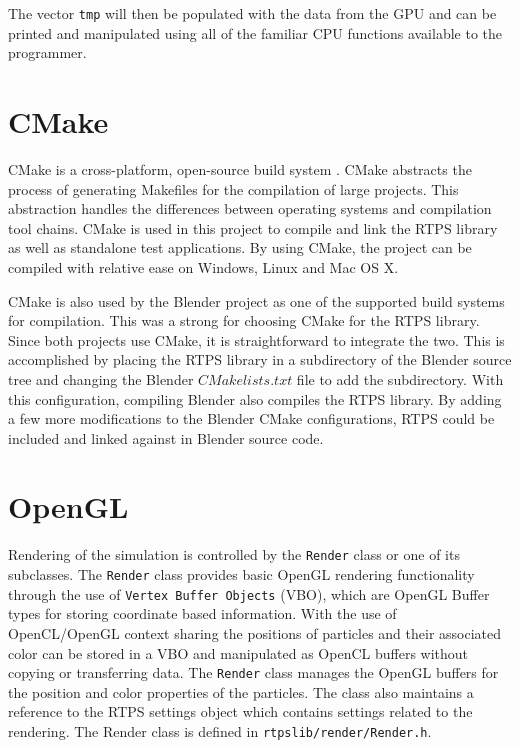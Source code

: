The vector \verb|tmp| will then be populated with the data from the GPU and can
be printed and manipulated using all of the familiar CPU functions available to
the programmer. 

\section{CMake}
CMake is a cross-platform, open-source build system \cite{CMake}. CMake
abstracts the process of generating Makefiles for the compilation of large
projects. This abstraction handles the differences between operating systems
and compilation tool chains. CMake is used in this project to compile and link
the RTPS library as well as standalone test applications. By using CMake, the project
can be compiled with relative ease on Windows, Linux and Mac OS X.


CMake is also used by the Blender project as one of the supported build systems
for compilation. This was a strong for choosing 
CMake for the RTPS library. Since both projects use CMake, it is 
straightforward to integrate the two. This is accomplished by placing the RTPS
library in a subdirectory of the Blender source tree and changing the Blender
$CMakelists.txt$ file to add the subdirectory. With this configuration,
compiling Blender also compiles the RTPS library. By adding a few more
modifications to the Blender CMake configurations, RTPS could be included and
linked against in Blender source code.



\section{OpenGL}

Rendering of the simulation is controlled by the \verb|Render| class or one of
its subclasses. The \verb|Render| class provides basic OpenGL rendering
functionality through the use of {\tt Vertex Buffer Objects} (VBO), which are
OpenGL Buffer types for storing coordinate based information. With the use of
OpenCL/OpenGL context sharing the positions of particles and their associated
color can be stored in a VBO and manipulated as OpenCL buffers without copying
or transferring data. The \verb|Render| class manages the OpenGL buffers for
the position and color properties of the particles. The class also maintains a
reference to the RTPS settings object which contains settings related to the
rendering. The Render class is defined in \verb|rtpslib/render/Render.h|.


